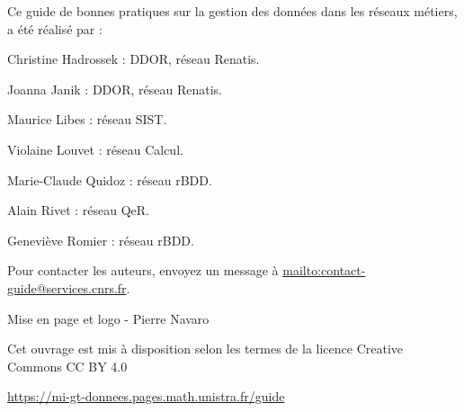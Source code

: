 \vspace*{\fill}
\begingroup

Ce guide de bonnes pratiques sur la gestion des données dans les réseaux métiers, a été réalisé par  :

\begin{list}{-}{}
\item Christine Hadrossek : DDOR, réseau Renatis.
\item Joanna Janik : DDOR, réseau Renatis.
\item Maurice Libes : réseau SIST.
\item Violaine Louvet : réseau Calcul.
\item Marie-Claude Quidoz : réseau rBDD.
\item Alain Rivet : réseau QeR.
\item Geneviève Romier : réseau rBDD.
\end{list}

Pour contacter les auteurs, envoyez un message à \url{mailto:contact-guide@services.cnrs.fr}.

Mise en page et logo - Pierre Navaro

Cet ouvrage est mis à disposition selon les termes de la licence Creative Commons CC BY 4.0 \ccby

\url{https://mi-gt-donnees.pages.math.unistra.fr/guide}

\endgroup

\vspace*{\fill}
\clearpage
